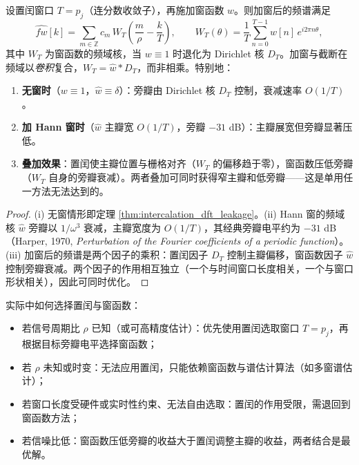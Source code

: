 \begin{proposition}[置闰与窗函数的互补界]\label{prop:intercalation_window_complementarity}
设置闰窗口 $T=p_j$（连分数收敛子），再施加窗函数 $w$。则加窗后的频谱满足
\[
\widehat{fw}[k]=\sum_{m\in\mathbb{Z}}c_m\,W_T\!\left(\frac{m}{\rho}-\frac{k}{T}\right),\qquad W_T(\theta)=\frac1T\sum_{n=0}^{T-1}w[n]\,e^{i2\pi n\theta},
\]
其中 $W_T$ 为窗函数的频域核，当 $w\equiv1$ 时退化为 Dirichlet 核 $D_T$。加窗与截断在频域以\emph{卷积}复合，$W_T=\widehat{w}*D_T$，而非相乘。特别地：
\begin{enumerate}[label=(\roman*)]
    \item \textbf{无窗时}（$w\equiv 1$，$\widehat{w}\equiv\delta$）：旁瓣由 Dirichlet 核 $D_T$ 控制，衰减速率 $O(1/T)$。
    \item \textbf{加 Hann 窗时}（$\widehat{w}$ 主瓣宽 $O(1/T)$，旁瓣 $-31$ dB）：主瓣展宽但旁瓣显著压低。
    \item \textbf{叠加效果}：置闰使主瓣位置与栅格对齐（$W_T$ 的偏移趋于零），窗函数压低旁瓣（$W_T$ 自身的旁瓣衰减）。两者叠加可同时获得窄主瓣和低旁瓣——这是单用任一方法无法达到的。
\end{enumerate}
\end{proposition}

\begin{proof}
(i) 无窗情形即定理 \ref{thm:intercalation_dft_leakage}。(ii) Hann 窗的频域核 $\widehat{w}$ 旁瓣以 $1/\omega^3$ 衰减，主瓣宽度为 $O(1/T)$，其经典旁瓣电平约为 $-31$ dB（Harper, 1970, \textit{Perturbation of the Fourier coefficients of a periodic function}）。(iii) 加窗后的频谱是两个因子的乘积：置闰因子 $D_T$ 控制主瓣偏移，窗函数因子 $\widehat{w}$ 控制旁瓣衰减。两个因子的作用相互独立（一个与时间窗口长度相关，一个与窗口形状相关），因此可同时优化。
\end{proof}

\begin{remark}[方法选择建议]\label{rem:method_selection_advice}
实际中如何选择置闰与窗函数：
\begin{itemize}
    \item 若信号周期比 $\rho$ 已知（或可高精度估计）：优先使用置闰选取窗口 $T=p_j$，再根据目标旁瓣电平选择窗函数；
    \item 若 $\rho$ 未知或时变：无法应用置闰，只能依赖窗函数与谱估计算法（如多窗谱估计）；
    \item 若窗口长度受硬件或实时性约束、无法自由选取：置闰的作用受限，需退回到窗函数方法；
    \item 若信噪比低：窗函数压低旁瓣的收益大于置闰调整主瓣的收益，两者结合是最优解。
\end{itemize}
\end{remark}

